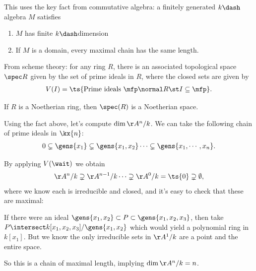 \begin{remark}

This uses the key fact from commutative algebra: a finitely generated
\(k\dash\)algebra \(M\) satisfies

\begin{enumerate}
\def\labelenumi{\arabic{enumi}.}
\tightlist
\item
  \(M\) has finite \(k\dash\)dimension
\item
  If \(M\) is a domain, every maximal chain has the same length.
\end{enumerate}

\end{remark}

\begin{remark}

From scheme theory: for any ring \(R\), there is an associated
topological space \(\spec R\) given by the set of prime ideals in \(R\),
where the closed sets are given by
\begin{align*}  
V(I) = \ts{\text{Prime ideals } \mfp \normal R \st I\subseteq \mfp }
.\end{align*}

If \(R\) is a Noetherian ring, then \(\spec(R)\) is a Noetherian space.

\end{remark}

\begin{example}

Using the fact above, let's compute \(\dim \AA^n/k\). We can take the
following chain of prime ideals in \(\kx{n}\):
\begin{align*}  
0 \subsetneq \gens{x_1} \subsetneq \gens{x_1, x_2} \cdots \subsetneq \gens{x_1, \cdots, x_n}
.\end{align*}

By applying \(V(\wait)\) we obtain
\begin{align*}  
\AA^n/k \supsetneq \AA^{n-1}/k \cdots \supsetneq \AA^0/k = \ts{0} \supsetneq \emptyset
,\end{align*} where we know each is irreducible and closed, and it's
easy to check that these are maximal:

If there were an ideal
\(\gens{x_1, x_2} \subset P \subset \gens{x_1, x_2, x_3}\), then take
\(P\intersect k[x_1, x_2, x_3] / \gens{x_1, x_2}\) which would yield a
polynomial ring in \(k[x_1]\). But we know the only irreducible sets in
\(\AA^1/k\) are a point and the entire space.

So this is a chain of maximal length, implying \(\dim \AA^n/k = n\).

\end{example}

